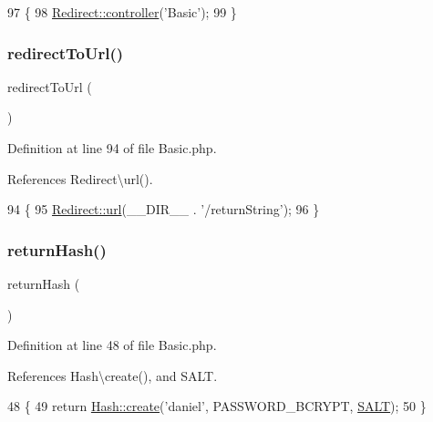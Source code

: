 \begin{DoxyCode}
97                                            \{
98         \hyperlink{class_redirect_ab7d0d268b6aaa9a5470b7cb8c7eb1b61}{Redirect::controller}(\textcolor{stringliteral}{'Basic'});
99     \}
\end{DoxyCode}
\hypertarget{class_basic_abf786273f796a96f5532dc60f9cec813}{}\label{class_basic_abf786273f796a96f5532dc60f9cec813} 
\subsubsection{\texorpdfstring{redirect\+To\+Url()}{redirectToUrl()}}
{\footnotesize\ttfamily redirect\+To\+Url (\begin{DoxyParamCaption}{ }\end{DoxyParamCaption})}



Definition at line 94 of file Basic.\+php.



References Redirect\textbackslash{}url().


\begin{DoxyCode}
94                                     \{
95         \hyperlink{class_redirect_a8c51feb32df9ae35002451714b7a9a73}{Redirect::url}(\_\_DIR\_\_ . \textcolor{stringliteral}{'/returnString'});
96     \}
\end{DoxyCode}
\hypertarget{class_basic_a16df2136bd66a75022f350d583e6c060}{}\label{class_basic_a16df2136bd66a75022f350d583e6c060} 
\subsubsection{\texorpdfstring{return\+Hash()}{returnHash()}}
{\footnotesize\ttfamily return\+Hash (\begin{DoxyParamCaption}{ }\end{DoxyParamCaption})}



Definition at line 48 of file Basic.\+php.



References Hash\textbackslash{}create(), and S\+A\+LT.


\begin{DoxyCode}
48                                  \{
49         \textcolor{keywordflow}{return} \hyperlink{class_hash_a0a163e3c00c0e2a4b2f90b35f82adf49}{Hash::create}(\textcolor{stringliteral}{'daniel'}, PASSWORD\_BCRYPT, \hyperlink{config_8php_a6d448b74f10f8080293b329a47a046b4}{SALT});
50     \}
\end{DoxyCode}
\hypertarget{class_basic_a8d2918087022004ef5ad62d8f76a73d7}{}\label{class_basic_a8d2918087022004ef5ad62d8f76a73d7} 
